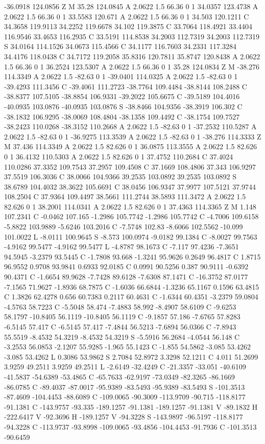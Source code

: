 {{{-36.0918 124.0856 Z M 35.28 124.0845 A 2.0622 1.5 66.36 0 1 34.0357 123.4738 A 2.0622 1.5 66.36 0 1 33.5583 120.671 A 2.0622 1.5 66.36 0 1 34.503 120.1211 C 34.3658 119.9113 34.2252 119.6678 34.102 119.3875 C 33.7064 118.4921 33.4404 116.9546 33.4653 116.2935 C 33.5191 114.8538 34.2003 112.7319 34.2003 112.7319 S 34.0164 114.1526 34.0673 115.4566 C 34.1177 116.7603 34.2331 117.3284 34.4176 118.0438 C 34.7172 119.2058 35.8316 120.7811 35.8747 120.8438 A 2.0622 1.5 66.36 0 1 36.2524 123.5307 A 2.0622 1.5 66.36 0 1 35.28 124.0834 Z M -38.276 114.3349 A 2.0622 1.5 -82.63 0 1 -39.0401 114.0325 A 2.0622 1.5 -82.63 0 1 -39.4293 111.3456 C -39.4061 111.2723 -38.7764 109.4484 -38.8144 108.2488 C -38.8377 107.5105 -38.8854 106.9331 -39.2022 105.6675 C -39.5189 104.4016 -40.0935 103.0876 -40.0935 103.0876 S -38.8466 104.9356 -38.3919 106.302 C -38.1832 106.9295 -38.0069 108.4804 -38.1358 109.4492 C -38.1754 109.7527 -38.2423 110.0268 -38.3152 110.2668 A 2.0622 1.5 -82.63 0 1 -37.2532 110.5287 A 2.0622 1.5 -82.63 0 1 -36.9275 113.3539 A 2.0622 1.5 -82.63 0 1 -38.276 114.3333 Z M 37.436 114.3349 A 2.0622 1.5 82.626 0 1 36.0875 113.3555 A 2.0622 1.5 82.626 0 1 36.4132 110.5303 A 2.0622 1.5 82.626 0 1 37.4752 110.2684 C 37.4024 110.0286 37.3352 109.7543 37.2957 109.4508 C 37.1669 108.4806 37.343 106.9297 37.5519 106.3036 C 38.0066 104.9366 39.2535 103.0892 39.2535 103.0892 S 38.6789 104.4032 38.3622 105.6691 C 38.0456 106.9347 37.9977 107.5121 37.9744 108.2504 C 37.9364 109.4497 38.5661 111.2744 38.5893 111.3472 A 2.0622 1.5 82.626 0 1 38.2001 114.0341 A 2.0622 1.5 82.626 0 1 37.4363 114.3365 Z M 1.148 107.2341 C -0.0462 107.165 -1.2986 105.7742 -1.2986 105.7742 C -4.7006 109.6158 -5.8822 103.9889 -5.6246 103.2016 C -7.5748 102.83 -8.6066 102.5562 -10.099 101.0022 L -8.0111 100.9645 S -8.573 100.0974 -9.0182 99.1384 C -8.0027 99.7563 -4.9162 99.5477 -4.9162 99.5477 L -4.8787 98.1673 C -7.117 97.4236 -7.3651 94.5945 -3.2379 93.5445 C -1.7808 93.668 -1.3241 95.9626 0.2649 96.4817 C 1.8715 96.9552 0.9708 93.9841 0.6933 92.0185 C 0.0991 90.5256 0.387 90.9111 -0.6392 90.4371 C -1.6654 89.9628 -7.7428 89.6128 -7.6308 87.1471 C -16.3752 87.0177 -7.1565 71.9627 -1.8936 68.7875 C -1.6036 66.6844 -1.3236 65.1167 0.1596 63.4815 C 1.3826 62.4278 0.656 60.7383 0.2117 60.4631 C -1.6344 60.4351 -3.2379 59.0804 -4.5763 58.7223 C -5.5048 58.474 -7.4883 58.992 -8.4907 58.6109 C -9.6253 58.1797 -10.8405 56.1119 -10.8405 56.1119 C -9.1857 57.186 -7.6765 57.8283 -6.5145 57.417 C -6.5145 57.417 -7.4844 56.5213 -7.6894 56.0366 C -7.8943 55.5519 -8.4532 54.3219 -8.4532 54.3219 S -5.5916 56.2684 -4.0544 56.148 C -3.2553 56.0853 -2.1207 55.9285 -1.965 55.1423 C -1.855 54.5862 -3.085 53.4262 -3.085 53.4262 L 0.3086 53.9862 S 2.7084 52.8972 3.3298 52.1211 C 4.011 51.2699 3.9259 49.2511 3.9259 49.2511 L -2.6149 -32.4249 C -21.3357 -33.051 -40.6109 -41.5837 -54.6389 -53.4865 C -65.7633 -62.9197 -73.0349 -82.3265 -86.1669 -86.0785 C -89.4037 -87.0017 -95.9389 -83.5493 -95.9389 -83.5493 S -101.3513 -87.4609 -104.4453 -88.6089 C -109.0065 -90.3009 -113.9709 -90.715 -118.8177 -91.1381 C -143.9757 -93.335 -189.1257 -91.1381 -189.1257 -91.1381 V -89.1832 H -222.6417 V -92.3696 H -189.1257 V -94.3228 S -143.9897 -96.5197 -118.8177 -94.3228 C -113.9737 -93.8998 -109.0065 -93.4856 -104.4453 -91.7936 C -101.3513 -90.6459 }}}
